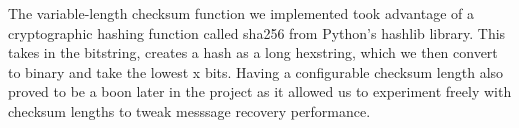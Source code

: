 \documentclass[titlepage]{article}
\begin{document}
The variable-length checksum function we implemented took advantage of a cryptographic hashing function called sha256 from Python's hashlib library. This takes in the bitstring, creates a hash as a long hexstring, which we then convert to binary and take the lowest x bits. Having a configurable checksum length also proved to be a boon later in the project as it allowed us to experiment freely with checksum lengths to tweak messsage recovery performance.

\begin{figure}
\makebox[\textwidth][c]{
}
\end{figure}
\end{document}

